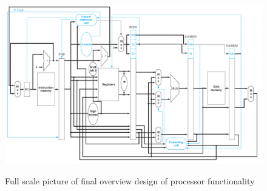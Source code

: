 \begin{figure}[h]
	\caption{Full scale picture of final overview design of processor functionality}
	\includegraphics[scale=0.65, angle=90]{figures/design2.png}
	\label{fig:final-2-2-landscape}
\end{figure}
